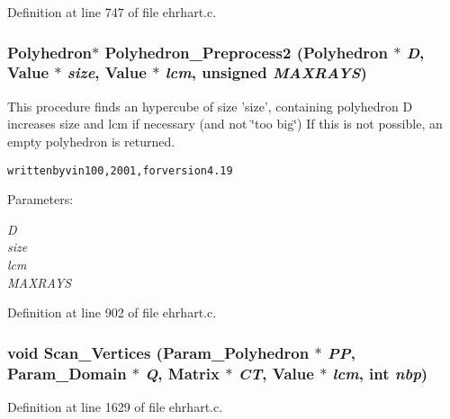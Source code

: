 Definition at line 747 of file ehrhart.c.
\subsubsection{\setlength{\rightskip}{0pt plus 5cm}Polyhedron$\ast$ Polyhedron\_\-Preprocess2 (Polyhedron $\ast$ {\em D}, Value $\ast$ {\em size}, Value $\ast$ {\em lcm}, unsigned {\em MAXRAYS})}\label{ehrhart_8c_a21}


This procedure finds an hypercube of size 'size', containing polyhedron D increases size and lcm if necessary (and not \char`\"{}too big\char`\"{}) If this is not possible, an empty polyhedron is returned.





\small\begin{alltt} written by vin100, 2001, for version 4.19\end{alltt}\normalsize 
\begin{Desc}
\item[Parameters: ]\par
\begin{description}
\item[{\em 
D}]\item[{\em 
size}]\item[{\em 
lcm}]\item[{\em 
MAXRAYS}]\end{description}
\end{Desc}


Definition at line 902 of file ehrhart.c.
\subsubsection{\setlength{\rightskip}{0pt plus 5cm}void Scan\_\-Vertices (Param\_\-Polyhedron $\ast$ {\em PP}, Param\_\-Domain $\ast$ {\em Q}, Matrix $\ast$ {\em CT}, Value $\ast$ {\em lcm}, int {\em nbp})\hspace{0.3cm}{\tt  [static]}}\label{ehrhart_8c_a25}




Definition at line 1629 of file ehrhart.c.
